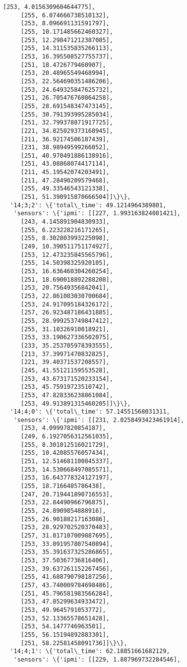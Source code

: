 \documentclass[11pt]{article}
\begin{document}
\begin{tcolorbox}[breakable, size=fbox, boxrule=.5pt, pad at break*=1mm, opacityfill=0]
\begin{Verbatim}[commandchars=\\\{\}]
     [253, 4.0156309604644775],
     [255, 6.074666738510132],
     [253, 8.096691131591797],
     [255, 10.171485662460327],
     [253, 12.298471212387085],
     [255, 14.311535835266113],
     [253, 16.395508527755737],
     [251, 18.4726779460907],
     [253, 20.48965549468994],
     [253, 22.564690351486206],
     [253, 24.649325847625732],
     [251, 26.705476760864258],
     [255, 28.691548347473145],
     [255, 30.791393995285034],
     [251, 32.799378871917725],
     [221, 34.825029373168945],
     [211, 36.92174506187439],
     [231, 38.98949599266052],
     [251, 40.970491886138916],
     [251, 43.08868074417114],
     [211, 45.19542074203491],
     [211, 47.28490209579468],
     [255, 49.33546543121338],
     [251, 51.390915870666504]]\}\},
  '14;3;2': \{'total\_time': 49.1214964389801,
   'sensors': \{'ipmi': [[227, 1.993163824081421],
     [243, 4.145891904830933],
     [255, 6.223228216171265],
     [255, 8.302803993225098],
     [249, 10.390511751174927],
     [253, 12.473235845565796],
     [255, 14.50398325920105],
     [253, 16.636460304260254],
     [251, 18.690018892288208],
     [253, 20.75649356842041],
     [253, 22.861083030700684],
     [253, 24.917095184326172],
     [257, 26.923487186431885],
     [255, 28.999253749847412],
     [255, 31.10326910018921],
     [253, 33.190627336502075],
     [233, 35.253705978393555],
     [213, 37.39971470832825],
     [221, 39.40371537208557],
     [245, 41.55121159553528],
     [253, 43.673171520233154],
     [253, 45.75919723510742],
     [253, 47.828336238861084],
     [253, 49.913891315460205]]\}\},
  '14;4;0': \{'total\_time': 57.14551568031311,
   'sensors': \{'ipmi': [[231, 2.0258493423461914],
     [253, 4.09997820854187],
     [249, 6.1927056312561035],
     [255, 8.301012516021729],
     [255, 10.42085576057434],
     [251, 12.514681100845337],
     [253, 14.530668497085571],
     [253, 16.643778324127197],
     [255, 18.7166485786438],
     [247, 20.719441890716553],
     [253, 22.84490966796875],
     [255, 24.8909854888916],
     [255, 26.90188217163086],
     [253, 28.929702520370483],
     [257, 31.017107009887695],
     [253, 33.091957807540894],
     [253, 35.391637325286865],
     [253, 37.50367736816406],
     [253, 39.637261152267456],
     [255, 41.688790798187256],
     [257, 43.740009784698486],
     [251, 45.796581983566284],
     [253, 47.85299634933472],
     [253, 49.9645791053772],
     [253, 52.13365578651428],
     [253, 54.1477746963501],
     [255, 56.15194892883301],
     [251, 58.22581458091736]]\}\},
  '14;4;1': \{'total\_time': 62.18851661682129,
   'sensors': \{'ipmi': [[229, 1.887969732284546],

\end{Verbatim}
\end{tcolorbox}
\end{document}

